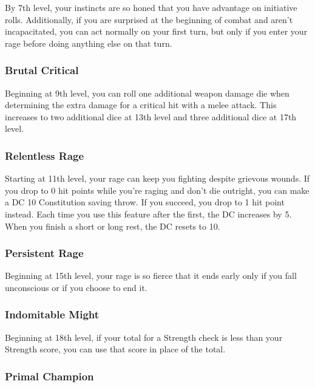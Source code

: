 By 7th level, your instincts are so honed that you have advantage on
initiative rolls. Additionally, if you are surprised at the beginning of
combat and aren't incapacitated, you can act normally on your first
turn, but only if you enter your rage before doing anything else on that
turn.

\subsubsection{Brutal
Critical}\label{dreadnought-feature-brutal-critical}

Beginning at 9th level, you can roll one additional weapon damage die
when determining the extra damage for a critical hit with a melee
attack. This increases to two additional dice at 13th level and three
additional dice at 17th level.

\subsubsection{Relentless
Rage}\label{dreadnought-feature-relentless-rage}

Starting at 11th level, your rage can keep you fighting despite grievous
wounds. If you drop to 0 hit points while you're raging and don't die
outright, you can make a DC 10 Constitution saving throw. If you
succeed, you drop to 1 hit point instead. Each time you use this feature
after the first, the DC increases by 5. When you finish a short or long
rest, the DC resets to 10.

\subsubsection{Persistent
Rage}\label{dreadnought-feature-persistent-rage}

Beginning at 15th level, your rage is so fierce that it ends early only
if you fall unconscious or if you choose to end it.

\subsubsection{Indomitable
Might}\label{dreadnought-feature-indomitable-might}

Beginning at 18th level, if your total for a Strength check is less than
your Strength score, you can use that score in place of the total.

\subsubsection{Primal
Champion}\label{dreadnought-feature-primal-champion}

